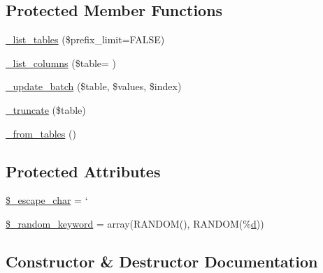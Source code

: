 \subsection*{Protected Member Functions}
\begin{DoxyCompactItemize}
\item 
\hyperlink{class_c_i___d_b__pdo__cubrid__driver_a435c0f3ce54fe7daa178baa8532ebd54}{\+\_\+list\+\_\+tables} (\$prefix\+\_\+limit=F\+A\+L\+S\+E)
\item 
\hyperlink{class_c_i___d_b__pdo__cubrid__driver_a2a81bb476a5c76fe6f763b0557c1e4c2}{\+\_\+list\+\_\+columns} (\$table= \textquotesingle{}\textquotesingle{})
\item 
\hyperlink{class_c_i___d_b__pdo__cubrid__driver_a336b9ebb119e47b6a84bb7fc9d4dae93}{\+\_\+update\+\_\+batch} (\$table, \$values, \$index)
\item 
\hyperlink{class_c_i___d_b__pdo__cubrid__driver_aa029600528fc1ce660a23ff4b4667f95}{\+\_\+truncate} (\$table)
\item 
\hyperlink{class_c_i___d_b__pdo__cubrid__driver_aef43f7e3e7b71d337ff3724c5eb14f10}{\+\_\+from\+\_\+tables} ()
\end{DoxyCompactItemize}
\subsection*{Protected Attributes}
\begin{DoxyCompactItemize}
\item 
\hyperlink{class_c_i___d_b__pdo__cubrid__driver_aaec2fb0112850159063a8e47ad3aed6e}{\$\+\_\+escape\+\_\+char} = \textquotesingle{}`\textquotesingle{}
\item 
\hyperlink{class_c_i___d_b__pdo__cubrid__driver_a10213aa6e05f6d924d3277bb1d2fea00}{\$\+\_\+random\+\_\+keyword} = array(\textquotesingle{}R\+A\+N\+D\+O\+M()\textquotesingle{}, \textquotesingle{}R\+A\+N\+D\+O\+M(\%\hyperlink{assets_2js_2bootstrap_8min_8js_aeb337d295abaddb5ec3cb34cc2e2bbc9}{d})\textquotesingle{})
\end{DoxyCompactItemize}


\subsection{Constructor \& Destructor Documentation}
\hypertarget{class_c_i___d_b__pdo__cubrid__driver_a9162320adff1a1a4afd7f2372f753a3e}{}
